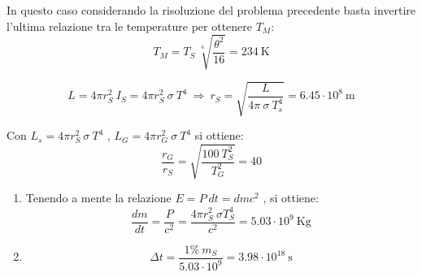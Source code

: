 \documentclass[12pt,twoside,a4]{article}
\begin{document}
\begin{solution}
 In questo caso considerando la risoluzione del problema precedente basta invertire l'ultima relazione tra le temperature per ottenere $T_M$: 
 \begin{equation*}
     T_M = T_S \ \sqrt[4]{\frac{\theta^2}{16}} = 234 \ \mathrm{K} 
 \end{equation*}
\end{solution}



\begin{solution}
 \begin{equation*}
 L = 4\pi r^2_S \ I_S = 4\pi r^2_S \ \sigma \ T^4  \  \Rightarrow  \  r_S = \sqrt{\frac{L}{4\pi \ \sigma \ T^4_s}} = 6.45 \cdot 10^8 \ \mathrm{m}  
 \end{equation*}
\end{solution}


\newpage
\begin{solution}
 Con $ L_s = 4\pi r^2_S \ \sigma \ T^4 $ ,  $ L_G = 4\pi r^2_G \ \sigma \ T^4 $ si ottiene: 
 \begin{equation*}
     \frac{r_G}{r_S} = \sqrt{\frac{100 \ T^2_S}{T^2_G}} = 40 
 \end{equation*}
\end{solution}



\begin{solution}
\begin{enumerate}[label=(\textit{\roman*})]
	\item Tenendo a mente la relazione $E = P \ dt = dm c^2$ , si ottiene: 
\begin{equation*}
    \frac{dm}{dt} = \frac{P}{c^2} = \frac{4\pi r^2_S \ \sigma T^4_S}{c^2} = 5.03 \cdot 10^9 \ \mathrm{Kg} 
\end{equation*}

\item \begin{equation*}
    \Delta t = \frac{1\% \ m_S}{5.03 \cdot 10^9} = 3.98 \cdot 10^{18} \ \mathrm{s} 
\end{equation*}
\end{enumerate}
\end{solution}
\end{document}
